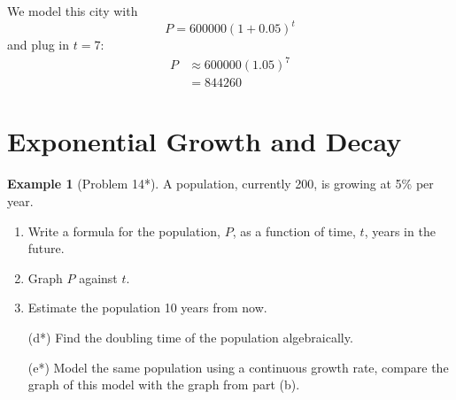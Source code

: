 \documentclass[oneside]{book}
\theoremstyle{definition}
\newtheorem{example}{Example}
\theoremstyle{solution}
\newtheorem*{solution}{Solution}
\newenvironment{solution}{\vspace{2in}\comment}{\endcomment}
\begin{document}
\begin{solution}
We model this city with 
$$
P = 600 000 (1+0.05)^t
$$
and plug in $t=7$:
\begin{align*}
P & \approx 600 000 (1.05)^7\\
  & = 844 260
\end{align*}
\end{solution}


\section{Exponential Growth and Decay}

\begin{example}[Problem 14*]
A population, currently 200, is growing at 5\% per year.
\begin{enumerate}
\item   
Write a formula for the population, $P$, as a function of
time, $t$, years in the future. 

\item   
Graph $P$ against $t$.

\item   
Estimate the population 10 years from now.

\item[(d*)] Find the doubling time of the population algebraically.

\item[(e*)] Model the same population using a continuous
  growth rate, compare the graph of this model with the graph from
  part (b).  
\end{enumerate}
\end{example}
\end{document}
